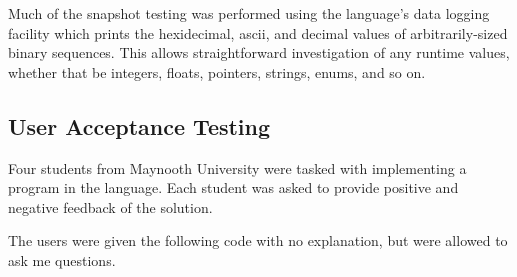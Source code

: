 \documentclass[12pt,a4paper,twoside]{report}
\begin{document}
Much of the snapshot testing was performed using the language's data logging facility which prints the hexidecimal, ascii, and decimal values of arbitrarily-sized binary sequences. This allows straightforward investigation of any runtime values, whether that be integers, floats, pointers, strings, enums, and so on.

\subsection{User Acceptance Testing}

Four students from Maynooth University were tasked with implementing a program in the language. Each student was asked to provide positive and negative feedback of the solution.

The users were given the following code with no explanation, but were allowed to ask me questions.
\end{document}
